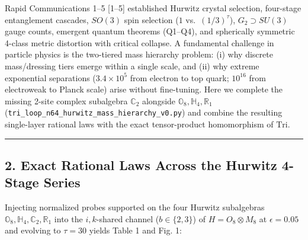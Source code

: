 \documentclass[
  a4paper,
]{article}
\begin{document}
Rapid Communications 1--5 {[}1--5{]} established Hurwitz crystal
selection, four-stage entanglement cascades, \(SO(3)\) spin selection
(\(1\) vs.~\((1/3)^\tau\)), \(G_2 \supset SU(3)\) gauge counts, emergent
quantum theorems (Q1--Q4), and spherically symmetric 4-class metric
distortion with critical collapse. A fundamental challenge in particle
physics is the two-tiered mass hierarchy problem: (i) why discrete
mass/dressing tiers emerge within a single scale, and (ii) why extreme
exponential separations (\(3.4 \times 10^5\) from electron to top quark;
\(10^{16}\) from electroweak to Planck scale) arise without fine-tuning.
Here we complete the missing 2-site complex subalgebra \(\mathbb{C}_2\)
alongside \(\mathbb{O}_8, \mathbb{H}_4, \mathbb{R}_1\)
(\texttt{tri\_loop\_n64\_hurwitz\_mass\_hierarchy\_v0.py}) and combine
the resulting single-layer rational laws with the exact tensor-product
homomorphism of \(\mathrm{Tri}\).

\begin{center}\rule{0.5\linewidth}{0.5pt}\end{center}

\subsection{2. Exact Rational Laws Across the Hurwitz 4-Stage
Series}\label{exact-rational-laws-across-the-hurwitz-4-stage-series}

Injecting normalized probes supported on the four Hurwitz subalgebras
\(\mathbb{O}_8, \mathbb{H}_4, \mathbb{C}_2, \mathbb{R}_1\) into the
\(i, k\)-shared channel (\(b \in \{2,3\}\)) of \(H = O_8 \otimes M_8\)
at \(\epsilon = 0.05\) and evolving to \(\tau = 30\) yields Table 1 and
Fig. 1:
\end{document}
